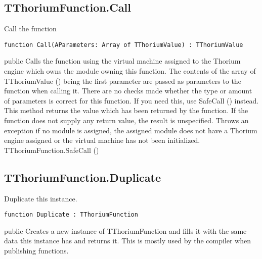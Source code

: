 \subsection{TThoriumFunction.Call}
\label{thoriumcorepkg:thorium:tthoriumfunction:call}
\begin{FPCList}
\Synopsis
Call the function\Declaration 

\begin{verbatim}
function Call(AParameters: Array of TThoriumValue) : TThoriumValue
\end{verbatim}
\Visibility
public
\Description
Calls the function using the virtual machine assigned to the Thorium engine which owns the module owning this function. The contents of the array of TThoriumValue (\pageref{thoriumcorepkg:thorium:tthoriumvalue}) being the first parameter are passed as parameters to the function when calling it. There are no checks made whether the type or amount of parameters is correct for this function. If you need this, use SafeCall (\pageref{thoriumcorepkg:thorium:tthoriumfunction:safecall}) instead. This method returns the value which has been returned by the function. If the function does not supply any return value, the result is unspecified.\Errors
Throws an exception if no module is assigned, the assigned module does not have a Thorium engine assigned or the virtual machine has not been initialized.\SeeAlso
TThoriumFunction.SafeCall (\pageref{thoriumcorepkg:thorium:tthoriumfunction:safecall})\end{FPCList}
\subsection{TThoriumFunction.Duplicate}
\label{thoriumcorepkg:thorium:tthoriumfunction:duplicate}
\begin{FPCList}
\Synopsis
Duplicate this instance.\Declaration 

\begin{verbatim}
function Duplicate : TThoriumFunction
\end{verbatim}
\Visibility
public
\Description
Creates a new instance of TThoriumFunction and fills it with the same data this instance has and returns it. This is mostly used by the compiler when publishing functions.\end{FPCList}
